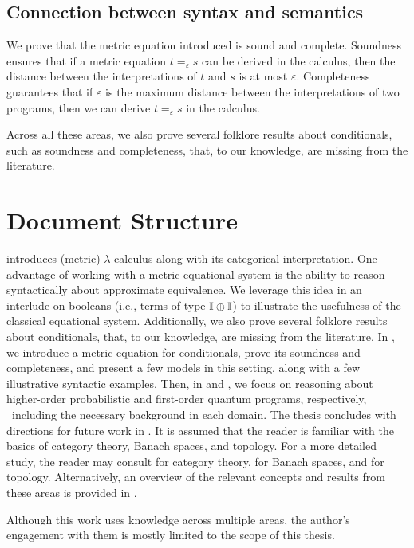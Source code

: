 \subsection*{Connection between syntax and semantics}
We prove that the metric equation introduced is sound and complete. Soundness ensures that if a metric equation $t =_{\varepsilon} s$ can be derived in the calculus, then the distance between the interpretations of $t$ and $s$ is at most $\varepsilon$. Completeness guarantees that if $\varepsilon$ is the maximum distance between the interpretations of two programs, then we can derive $t =_{\varepsilon} s$ in the calculus. 

\vspace{10pt}
Across all these areas, we also prove several folklore results about conditionals, such as soundness and completeness, that, to our knowledge, are missing from the literature.




\section{Document Structure}

 introduces (metric) $\lambda$-calculus along with its categorical interpretation. One advantage of working with a metric equational system is the ability to reason syntactically about approximate equivalence. We leverage this idea in an interlude on booleans (i.e., terms of type $\mathbb{I} \oplus \mathbb{I}$) to illustrate the usefulness of the classical equational system. Additionally, we also prove several folklore results about conditionals, that, to our knowledge, are missing from the literature.
  In , we introduce a metric equation for conditionals, prove its soundness and completeness, and present a few models in this setting, along with a few illustrative syntactic examples. Then, in  and , we focus on reasoning about higher-order probabilistic and first-order quantum programs, respectively,  including the necessary background in each domain. The thesis concludes with directions for future work in . 
It is assumed that the reader is familiar with the basics of category theory, Banach spaces, and topology. For a more detailed study, the reader may consult \cite{awodeyCategoryTheory2010} for category theory, \cite[Chapters~1--2]{kreyszigIntroductoryFunctionalAnalysis2007} for Banach spaces, and \cite[Chapters~2~and~5]{guide2006infinite} for topology. Alternatively, an overview of the relevant concepts and results from these areas is provided in .


Although this work uses knowledge across multiple areas, the author's engagement with them is mostly limited to the scope of this thesis.


